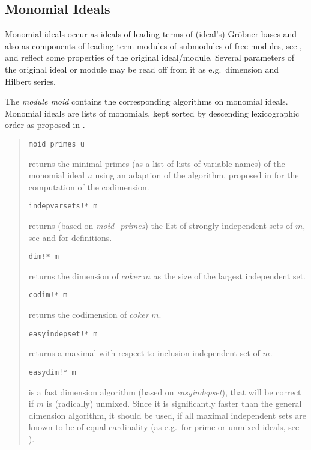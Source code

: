 \documentclass[a4paper,11pt]{article}
\newcommand{\gr}{Gr\"obner}
\newcommand{\ind}[1]{{\em #1}\index{#1}}
\newcommand{\pbx}[1]{\mbox{}\hfill \parbox[t]{12cm}{#1} \pagebreak[3]}
\begin{document}
\subsection{Monomial Ideals}

Monomial ideals occur as ideals of leading terms of (ideal's) {\gr}
bases and also as components of leading term modules of submodules of
free modules, see \cite{rois}, and reflect some properties of the
original ideal/module. Several parameters of the original ideal or
module may be read off from it as e.g.\ dimension and Hilbert series.  

The \ind{module moid} contains the corresponding algorithms on
monomial ideals. Monomial ideals are lists of monomials, kept sorted
by descending lexicographic order as proposed in \cite{BS}. 

\begin{quote}
\verb|moid_primes u| 

\pbx{returns the minimal primes (as a list of lists of variable
names) of the monomial ideal $u$ using an adaption of the algorithm,
proposed in \cite{BS} for the computation of the codimension.}

\verb|indepvarsets!* m|  

\pbx{returns (based on {\em moid\_primes}) the list of strongly
independent sets of $m$, see \cite{KW} and \cite{rois} for
definitions.}

\verb|dim!* m| 

\pbx{returns the dimension of $coker\ m$ as the size of the largest
independent set.}

\verb|codim!* m| 

\pbx{returns the codimension of $coker\ m$.}

\verb|easyindepset!* m| 

\pbx{returns a maximal with respect to inclusion independent set of
$m$.}

\verb|easydim!* m| 

\pbx{is a fast dimension algorithm (based on {\em easyindepset}), that
will be correct if $m$ is (radically) unmixed. Since it is
significantly faster than the general dimension
algorithm\footnotemark, it should 
be used, if all maximal independent sets are known to be of equal
cardinality (as e.g.\ for prime or unmixed ideals, see \cite{rois}).}
\end{quote}
\end{document}

